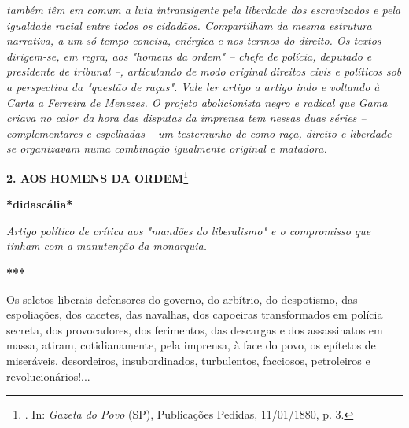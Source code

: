 \emph{também têm em comum a luta intransigente pela liberdade dos
escravizados e pela igualdade racial entre todos os cidadãos.
Compartilham da mesma estrutura narrativa, a um só tempo concisa,
enérgica e nos termos do direito. Os textos dirigem-se, em regra, aos
"homens da ordem" -- chefe de polícia, deputado e presidente de tribunal
--, articulando de modo original direitos civis e políticos sob a
perspectiva da "questão de raças". Vale ler artigo a artigo indo e
voltando à Carta a Ferreira de Menezes. O projeto abolicionista negro e
radical que Gama criava no calor da hora das disputas da imprensa tem
nessas duas séries -- complementares e espelhadas -- um testemunho de
como raça, direito e liberdade se organizavam numa combinação igualmente
original e matadora.}

\textbf{2. AOS HOMENS DA ORDEM}\footnote{. In: \emph{Gazeta do Povo}
  (SP), Publicações Pedidas, 11/01/1880, p. 3.}

\textbf{*didascália*}

\emph{Artigo político de crítica aos "mandões do liberalismo" e o
compromisso que tinham com a manutenção da monarquia.}

\textbf{***}

Os seletos liberais defensores do governo, do arbítrio, do despotismo,
das espoliações, dos cacetes, das navalhas, dos capoeiras transformados
em polícia secreta, dos provocadores, dos ferimentos, das descargas e
dos assassinatos em massa, atiram, cotidianamente, pela imprensa, à face
do povo, os epítetos de miseráveis, desordeiros, insubordinados,
turbulentos, facciosos, petroleiros e revolucionários!...

